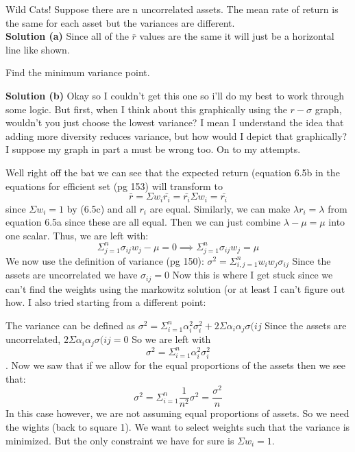 \documentclass[12pt]{article}
\newenvironment{problem}[3][Problem]{\begin{trivlist}
\item[\hskip \labelsep {\bfseries #1}\hskip \labelsep {\bfseries #2.}]}{\end{trivlist}}
\begin{document}
\begin{problem}6.  Wild Cats! Suppose there are n uncorrelated assets. The mean rate of return is the same for each asset but the variances are different. \\ 
\textbf{Solution (a)} Since all of the $\bar{r}$ values are the same it will just be a horizontal line like shown. \\
\begin{center}
\end{center}Find the minimum variance point. 


\textbf{Solution (b)} Okay so I couldn't get this one so i'll do my best to work through some logic. But first, when I think about this graphically using the $r-\sigma $ graph, wouldn't you just choose the lowest variance? I mean I understand the idea that adding more diversity reduces variance, but how would I depict that graphically? I suppose my graph in part a must be wrong too. On to my attempts. 

Well right off the bat we can see that the expected return (equation 6.5b in the equations for efficient set (pg 153) will transform to $$ \bar{r} = \Sigma w_i\bar{r_i} = \bar{r_i}\Sigma w_i = \bar{r_i}$$ since $\Sigma w_i = 1$ by (6.5c) and all $r_i$ are equal. Similarly, we can make $\lambda r_i = \lambda$ from equation 6.5a since these are all equal. Then we can just combine $\lambda - \mu = \mu $ into one scalar. Thus, we are left with: 
$$ \Sigma_{j=1}^n \sigma_{ij}w_j - \mu = 0 \implies \Sigma_{j=1}^n \sigma_{ij}w_j  = \mu $$
We now use the definition of variance (pg 150): $\sigma^2 = \Sigma_{i,j=1}^n w_iw_j\sigma_{ij}$ Since the assets are uncorrelated we have $\sigma_{ij}=0$ Now this is where I get stuck since we can't find the weights using the markowitz solution (or at least I can't figure out how. I also tried starting from a different point:

The variance can be defined as $\sigma^2 = \Sigma_{i=1}^n\alpha_i^2\sigma_i^2 + 2 \Sigma \alpha_i\alpha_j\sigma({ij}$ Since the assets are uncorrelated, $2 \Sigma \alpha_i\alpha_j\sigma({ij} = 0 $ So we are left with $$\sigma^2 = \Sigma_{i=1}^n\alpha_i^2\sigma_i^2 $$. Now we saw that if we allow for the equal proportions of the assets then we see that: $$\sigma^2 = \Sigma_{i=1}^n \frac{1}{n^2}\sigma^2 = \frac{\sigma^2}{n}$$ In this case however, we are not assuming equal proportions of assets. So we need the wights (back to square 1). We want to select weights such that the variance is minimized. But the only constraint we have for sure is $\Sigma w_i =1$. 
\end{problem}
\end{document}
